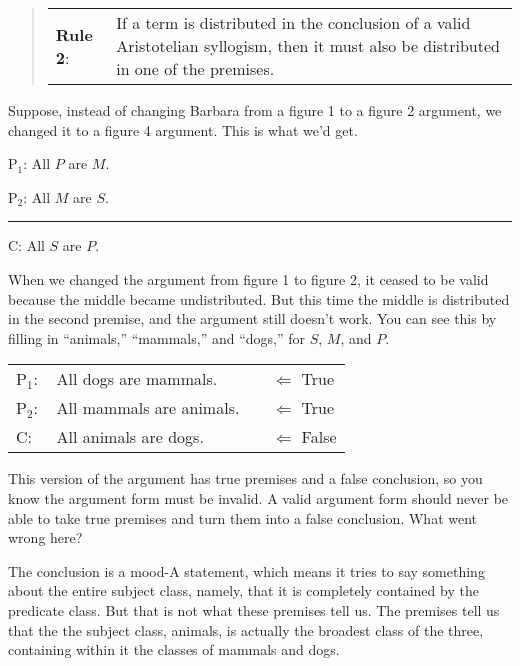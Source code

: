 \begin{quotation}
\begin{tabu}{p{.1\linewidth}p{.9\linewidth}}
\textbf{Rule 2}: & If a term is distributed in the conclusion of a valid Aristotelian syllogism, then it must also be distributed in one of the premises.  
\end{tabu}
\end{quotation}

Suppose, instead of changing Barbara from a figure 1 to a figure 2 argument, we changed it to a figure 4 argument. This is what we'd get.

\begin{earg}
\item[P$_1$:] All $P$ are $M$.
\item[P$_2$:] All $M$ are $S$.
\vspace{-.5em}
\item [] \rule{0.2\linewidth}{.5pt} 
\item[C:] All $S$ are $P$.
\end{earg}

When we changed the argument from figure 1 to figure 2, it ceased to be valid because the middle became undistributed. But this time the middle is distributed in the second premise, and the argument still doesn't work. You can see this by filling in ``animals,'' ``mammals,'' and ``dogs,'' for $S$, $M$, and $P$. 

\begin{tabu}{p{.02\linewidth}p{.3\linewidth}p{.1\linewidth}p{.58\linewidth}}
P$_1:$ &All dogs are mammals. & & $\Leftarrow$ True \\
P$_2:$ &All mammals are animals. & & $\Leftarrow$ True \\ 
C: &All animals are dogs. & & $\Leftarrow$ False
\end{tabu}

This version of the argument has true premises and a false conclusion, so you know the argument form must be invalid. \label{counter_example_method_instance} A valid argument form should never be able to take true premises and turn them into a false conclusion. What went wrong here?

The conclusion is a mood-A statement, which means it tries to say something about the entire subject class, namely, that it is completely contained by the predicate class. But that is not what these premises tell us. The premises tell us that the the subject class, animals, is actually the broadest class of the three, containing within it the classes of mammals and dogs.

